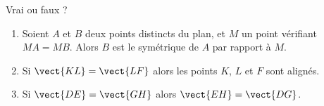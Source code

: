 
\begin{exercice}\label{exosmath-0651}

    Vrai ou faux ?
    \begin{enumerate}
        \item
                
            Soient \( A\) et \( B\) deux points distincts du plan, et \( M\) un point vérifiant \( MA=MB\). Alors \( B\) est le symétrique de \( A\) par rapport à \( M\).

        \item

            Si \( \vect{ KL }=\vect{ LF }\) alors les points \( K\), \( L\) et \( F\) sont alignés.

        \item

            Si \( \vect{ DE }=\vect{ GH }\) alors \( \vect{ EH }=\vect{ DG }\).

    \end{enumerate}
\end{exercice}
